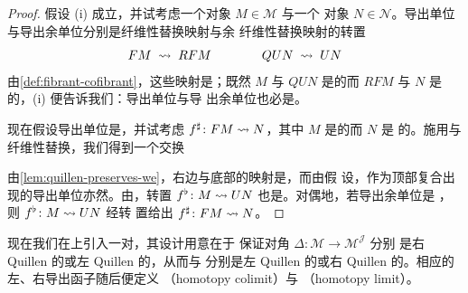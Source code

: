 \begin{proof}
假设 (i) 成立，并试考虑一个\trCofibrant{}对象 $M\in\mathcal{M}$ 与一个%
\trFibrant{}对象 $N\in\mathcal{N}$。导出单位与导出余单位分别是纤维性替换映射与余
纤维性替换映射的转置
\[ FM\;\rightsquigarrow\;RFM \qquad\qquad QUN\;\rightsquigarrow\;UN \]
由\cref{def:fibrant-cofibrant}，这些映射是\trWeakEquivalence；既然 $M$ 与 $QUN$
是\trCofibrant{}的而 $RFM$ 与 $N$ 是\trFibrant{}的，(i) 便告诉我们：导出单位与导
出余单位也必是\trWeakEquivalence。

现在假设导出单位是\trWeakEquivalence，并试考虑\trWeakEquivalence{}
$f^{\sharp}\colon FM\rightsquigarrow N$，其中 $M$ 是\trCofibrant{}的而 $N$ 是%
\trFibrant{}的。施用\trRightAdjoint{}与纤维性替换，我们得到一个交换\trDiagram
\begin{center}
\end{center}
由\cref{lem:quillen-preserves-we}，右边与底部的映射是\trWeakEquivalence，而由假
设，作为顶部复合出现的导出单位亦然。由\trTwoOfThreeProperty，转置
$f^{\flat}\colon M\rightsquigarrow UN$ 也是\trWeakEquivalence。对偶地，若导出余单位是%
\trWeakEquivalence，则\trWeakEquivalence{} $f^{\flat}\colon M\rightsquigarrow UN$ 经转
置给出\trWeakEquivalence{} $f^{\sharp}\colon FM\rightsquigarrow N$。
\end{proof}

现在我们在\trDiagram{}\trCategory{}上引入一对\trModelStructure，其设计用意在于
保证对角\trFunctor{} $\Delta\colon\mathcal{M}\to\mathcal{M}^{\mathcal{J}}$ 分别
是右 Quillen 的或左 Quillen 的，从而\trColimit{}\trFunctor{}与\trLimit{}\trFunctor{}%
分别是左 Quillen 的或右 Quillen 的。相应的左、右导出函子随后便定义%
\textbf{\trHomotopyColimit}（homotopy colimit）与\textbf{\trHomotopyLimit}
（homotopy limit）\trFunctor。

